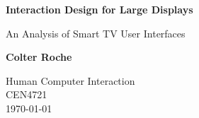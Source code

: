 \begin{titlepage}
    \begin{center}
        \vspace*{1cm}
            
        \Huge
        \textbf{Interaction Design for Large Displays}
        
        \vspace{0.5cm}
        \LARGE
        An Analysis of Smart TV User Interfaces 
            
        \vspace{1.5cm}
            
        \textbf{Colter Roche}
            
        \vfill
          
        \Large
        Human Computer Interaction\\
        CEN4721\\
        \today
            
    \end{center}
\end{titlepage}